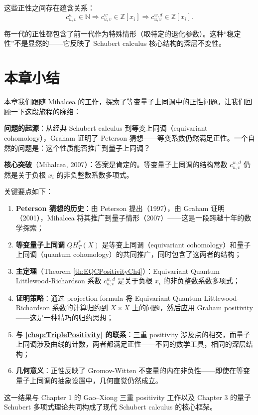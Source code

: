 这些正性之间存在蕴含关系：
$$c_{u,v}^w \in \mathbb{N} \Longrightarrow c_{u,v}^w \in \mathbb{Z}[x_i] \Longrightarrow c_{u,v}^{w,d} \in \mathbb{Z}[x_i].$$

每一代的正性都包含了前一代作为特殊情形（取特定的退化参数）。这种``稳定性''不是显然的——它反映了 Schubert calculus 核心结构的深层不变性。

\section{本章小结}
\label{sec:Chapter4Summary}

本章我们跟随 Mihalcea 的工作，探索了等变量子上同调中的正性问题。让我们回顾一下这段旅程的脉络：

\textbf{问题的起源}：从经典 Schubert calculus 到等变上同调（equivariant cohomology），Graham 证明了 Peterson 猜想——等变系数仍然满足正性。一个自然的问题是：这个性质能否推广到量子上同调？

\textbf{核心突破}（Mihalcea, 2007）：答案是肯定的。等变量子上同调的结构常数 $c_{u,v}^{w,d}$ 仍然是关于负根 $x_i$ 的非负整数系数多项式。

关键要点如下：
\begin{enumerate}
\item \textbf{Peterson 猜想的历史}：由 Peterson 提出（1997），由 Graham 证明（2001），Mihalcea 将其推广到量子情形（2007）——这是一段跨越十年的数学探索；
\item \textbf{等变量子上同调} $QH_T^*(X)$ 是等变上同调（equivariant cohomology）和量子上同调（quantum cohomology）的共同推广，同时包含了这两者的结构；
\item \textbf{主定理}（Theorem \cref{th:EQCPositivityCh4}）：Equivariant Quantum Littlewood-Richardson 系数 $c_{u,v}^{w,d}$ 是关于负根 $x_i$ 的非负整数系数多项式；
\item \textbf{证明策略}：通过 projection formula 将 Equivariant Quantum Littlewood-Richardson 系数的计算归约到 $X \times X$ 上的问题，然后应用 Graham positivity——这是一种精巧的归约思想；
\item \textbf{与 \cref{chap:TriplePositivity} 的联系}：三重 positivity 涉及点的相交，而量子上同调涉及曲线的计数，两者都满足正性——不同的数学工具，相同的深层结构；
\item \textbf{几何意义}：正性反映了 Gromov-Witten 不变量的内在非负性——即使在等变量子上同调的抽象设置中，几何直觉仍然成立。
\end{enumerate}

这一结果与 Chapter 1 的 Gao--Xiong \cite{GX2025} 三重 positivity 工作以及 Chapter 3 的量子 Schubert 多项式理论共同构成了现代 Schubert calculus 的核心框架。

